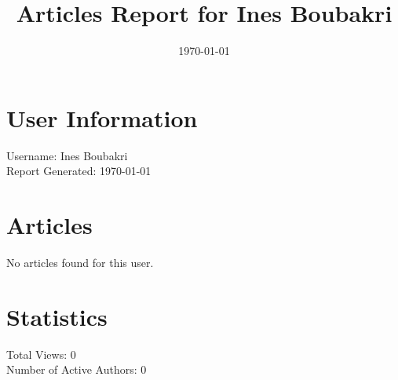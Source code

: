 \documentclass[a4paper,12pt]{article}
\title{Articles Report for Ines Boubakri}
\author{}
\date{\today}
\begin{document}
\maketitle
\section*{User Information}
Username: Ines Boubakri\\
Report Generated: \today\\
\section*{Articles}
No articles found for this user.
\section*{Statistics}
Total Views: 0\\
Number of Active Authors: 0
\end{document}
